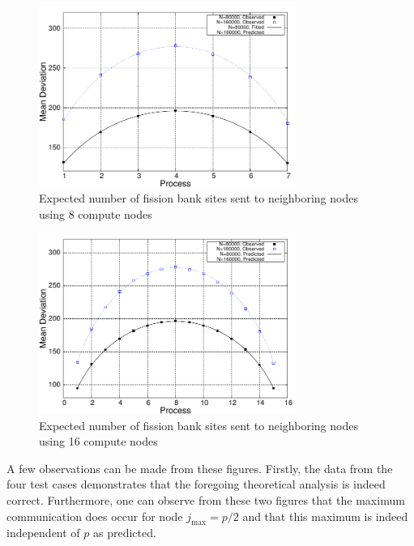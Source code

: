 \begin{figure}[ht!]
  \centering
  \includegraphics[width=0.75\textwidth]{figures/ch3/mean_deviance/plot8.pdf}
  \caption{Expected number of fission bank sites sent to neighboring nodes using
    8 compute nodes}
  \label{fig:mean-deviance8}
\end{figure}
\begin{figure}[ht!]
  \centering
  \includegraphics[width=0.75\textwidth]{figures/ch3/mean_deviance/plot16.pdf}
  \caption{Expected number of fission bank sites sent to neighboring nodes using
    16 compute nodes}
  \label{fig:mean-deviance16}
\end{figure}
A few observations can be made from these figures. Firstly, the data from the
four test cases demonstrates that the foregoing theoretical analysis is indeed
correct. Furthermore, one can observe from these two figures that the maximum
communication does occur for node $j_{\text{max}} = p/2$ and that this maximum
is indeed independent of $p$ as predicted.

